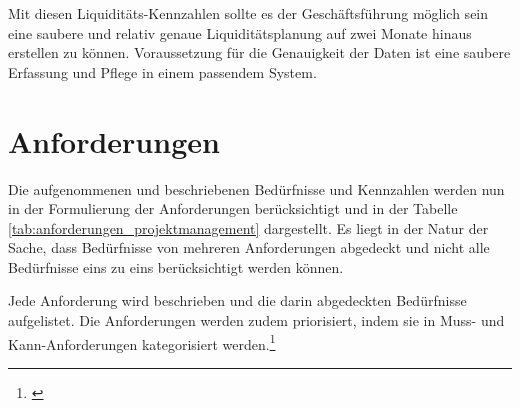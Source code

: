 Mit diesen Liquiditäts-Kennzahlen sollte es der Geschäftsführung möglich sein
eine saubere und relativ genaue Liquiditätsplanung auf zwei Monate hinaus
erstellen zu können. Voraussetzung für die Genauigkeit der Daten ist eine
saubere Erfassung und Pflege in einem passendem System.

\clearpage

\section{Anforderungen}\label{chap:sec_anforderungen}
Die aufgenommenen und beschriebenen Bedürfnisse und Kennzahlen werden nun in der Formulierung
der Anforderungen berücksichtigt und in der Tabelle \ref{tab:anforderungen_projektmanagement} 
dargestellt. Es liegt in der Natur der Sache, dass Bedürfnisse von mehreren 
Anforderungen abgedeckt und nicht alle Bedürfnisse eins zu eins berücksichtigt 
werden können.

Jede Anforderung wird beschrieben und die darin abgedeckten Bedürfnisse aufgelistet. 
Die Anforderungen werden zudem priorisiert, indem sie in Muss- und Kann-Anforderungen 
kategorisiert werden.\footnote{\citealp*[Vgl.][S. 32]{hobel2006gabler}}

